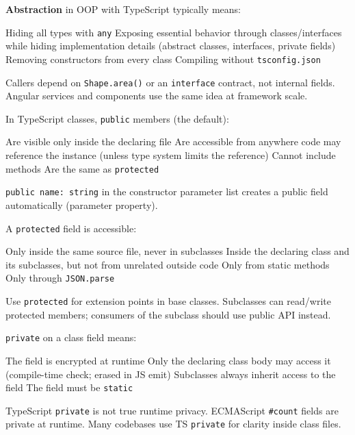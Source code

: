 \question[4]
\textbf{Abstraction} in OOP with TypeScript typically means:
\begin{choices}
  \choice Hiding all types with \lstinline[style=tsinline]|any|
  \CorrectChoice Exposing essential behavior through classes/interfaces while hiding implementation details (abstract classes, interfaces, private fields)
  \choice Removing constructors from every class
  \choice Compiling without \texttt{tsconfig.json}
\end{choices}
\begin{solution}
  Callers depend on \lstinline[style=tsinline]|Shape.area()| or an \lstinline[style=tsinline]|interface| contract, not internal fields. Angular services and components use the same idea at framework scale.
\end{solution}

\question[4]
In TypeScript classes, \lstinline[style=tsinline]|public| members (the default):
\begin{choices}
  \choice Are visible only inside the declaring file
  \CorrectChoice Are accessible from anywhere code may reference the instance (unless type system limits the reference)
  \choice Cannot include methods
  \choice Are the same as \lstinline[style=tsinline]|protected|
\end{choices}
\begin{solution}
  \lstinline[style=tsinline]|public name: string| in the constructor parameter list creates a public field automatically (parameter property).
\end{solution}

\question[4]
A \lstinline[style=tsinline]|protected| field is accessible:
\begin{choices}
  \choice Only inside the same source file, never in subclasses
  \CorrectChoice Inside the declaring class and its subclasses, but not from unrelated outside code
  \choice Only from static methods
  \choice Only through \lstinline[style=tsinline]|JSON.parse|
\end{choices}
\begin{solution}
  Use \lstinline[style=tsinline]|protected| for extension points in base classes. Subclasses can read/write protected members; consumers of the subclass should use public API instead.
\end{solution}

\question[4]
\lstinline[style=tsinline]|private| on a class field means:
\begin{choices}
  \choice The field is encrypted at runtime
  \CorrectChoice Only the declaring class body may access it (compile-time check; erased in JS emit)
  \choice Subclasses always inherit access to the field
  \choice The field must be \lstinline[style=tsinline]|static|
\end{choices}
\begin{solution}
  TypeScript \lstinline[style=tsinline]|private| is not true runtime privacy. ECMAScript \lstinline[style=tsinline]|#count| fields are private at runtime. Many codebases use TS \lstinline[style=tsinline]|private| for clarity inside class files.
\end{solution}

